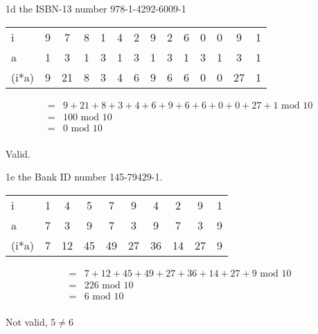 \begin{question}{1d}
the ISBN-13 number 978-1-4292-6009-1

\begin{tabular}{l|ccccccccccccc}
\hline
i     & 9  & 7  & 8  & 1  & 4  & 2  & 9  & 2  & 6  & 0 & 0 & 9 & 1\\
a     & 1  & 3  & 1  & 3  & 1  & 3  & 1  & 3  & 1  & 3 & 1 & 3 & 1 \\ 
\hline
(i*a) & 9  & 21 & 8  & 3  & 4  & 6  & 9  & 6  & 6  & 0 & 0 & 27 & 1
\end{tabular}

\begin{align*}
=& 9  + 21 + 8  + 3  + 4  + 6  + 9  + 6  + 6  + 0 + 0 + 27 + 1 \textrm{ mod } 10 \\
=& 100 \textrm{ mod } 10 \\
=& 0 \textrm{ mod } 10 \\
\end{align*}

Valid.
\end{question}


\begin{question}{1e}
the Bank ID number 145-79429-1.

\begin{tabular}{l|ccccccccc}
\hline
i     & 1  & 4  & 5  & 7  & 9  & 4  & 2  & 9  & 1 \\
a     & 7  & 3  & 9  & 7  & 3  & 9  & 7  & 3  & 9 \\ 
\hline
(i*a) & 7  & 12 & 45 & 49 & 27 & 36 & 14 & 27 & 9
\end{tabular}

\begin{align*}
=& 7  + 12 + 45 + 49 + 27 + 36 + 14 + 27 + 9 \textrm{ mod } 10\\
=& 226 \textrm{ mod } 10\\
=& 6 \textrm{ mod } 10\\
\end{align*}

Not valid, $5 \neq 6$
\end{question}


